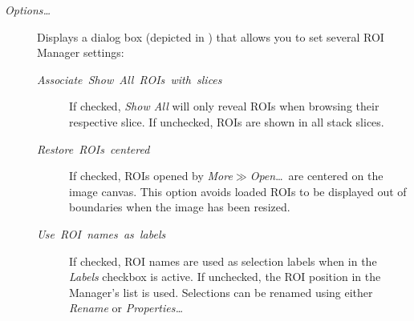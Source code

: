 \begin{description}
\item [{\emph{\label{misc:RM-Options...}Options\ldots{}}}] Displays a
dialog box (depicted in\emph{ }) that
allows you to set several ROI Manager settings:

\begin{description}
\item [{\emph{Associate\ \textquotedbl{}Show\ All\textquotedbl{}\ ROIs\ with\ slices}}] If
checked, \emph{Show All} will only reveal ROIs when browsing their
respective slice. If unchecked, ROIs are shown in all stack slices.
\item [{\emph{Restore\ ROIs\ centered}}] If checked, ROIs opened by \emph{More$\gg$Open}\ldots{}\ are
centered on the image canvas. This option avoids loaded ROIs to be
displayed out of boundaries when the image has been resized.
\item [{\emph{Use\ ROI\ names\ as\ labels}}] If checked, ROI names
are used as selection labels when in the \emph{Labels}
checkbox is active. If unchecked, the ROI position in the Manager's
list is used. Selections can be renamed using either \emph{Rename}
or \emph{Properties\ldots{}}
\end{description}
\end{description}



\subsubsection[\protect\userinterface{Scale Bar\ldots{}}]{\protect{}\label{sub:Scale-Bar...}\improvement{}}

